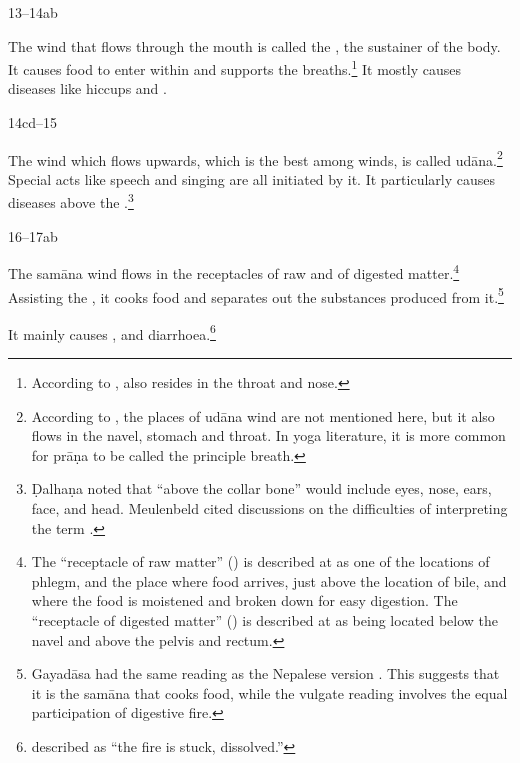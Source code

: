 \begin{translation}
\item[13--14ab] 

The wind that flows through the mouth is called the , the sustainer of the body.  It causes food to enter within and
supports the breaths.\footnote{According to
    ,  also resides in the throat
    and nose.} It mostly causes diseases like hiccups and
    .



\item[14cd--15] 

The wind which flows upwards, which is the best among winds, is called
udāna.\footnote{According to , the places
    of udāna wind are not mentioned here, but it also flows in the navel,
    stomach and throat.  In yoga literature, it is more common for prāṇa
    to be called the principle breath.} Special acts like speech and
    singing are all initiated by it. It particularly causes diseases
    above the .\footnote{Ḍalhaṇa noted that “above
        the collar bone” would include eyes, nose, ears, face, and head.
        Meulenbeld cited discussions on the difficulties of interpreting the
        term  \citep[465]{meul-1974}.}

\item [16--17ab]

The samāna wind flows in the receptacles of raw and of digested
matter.\footnote{The “receptacle of raw matter” () is
    described at  as one of the locations of phlegm, and
    the place where food arrives, just above the location of bile, and
    where the food is moistened and broken down for easy digestion.  The
    “receptacle of digested matter” () is described at
     as being located below the navel and above the pelvis
    and rectum.} Assisting the , it cooks food
    and separates out the substances produced from it.\footnote{Gayadāsa
        had the same reading  as the Nepalese version
        \citep[260, note~1 and the text of the \emph{Nyācacandrikā}]{vulgate}.
        This suggests that it is the samāna that cooks food, while the
        vulgate reading involves the equal participation of digestive fire.}

It mainly causes ,  and diarrhoea.\footnote{ described 
 as “the fire is stuck, dissolved.”}




\end{translation}
